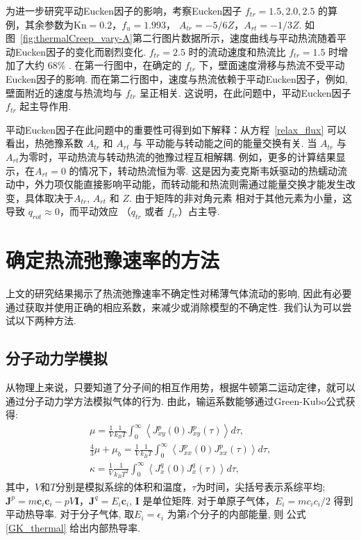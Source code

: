 为进一步研究平动Eucken因子的影响，考察Eucken因子 ${f_{tr}=1.5, 2.0, 2.5}$ 的算例，其余参数为$\text{Kn}=0.2$，$f_u=1.993$， $A_{tr}={-5/6Z}$，$A_{rt}={-1/3Z}$. 如图~\ref{fig:thermalCreep_vary-A}第二行图片数据所示，速度曲线与平动热流随着平动Eucken因子的变化而剧烈变化. ${f_{tr}=2.5}$ 时的流动速度和热流比 ${f_{tr}=1.5}$ 时增加了大约 ${68\%}$ . 在第一行图中，在确定的 $ f_{tr} $ 下，壁面速度滑移与热流不受平动Eucken因子的影响. 而在第二行图中，速度与热流依赖于平动Eucken因子，例如, 壁面附近的速度与热流均与 ${f_{tr}}$ 呈正相关. 这说明，在此问题中，平动Eucken因子 ${f_{tr}}$ 起主导作用.


平动Eucken因子在此问题中的重要性可得到如下解释：从方程~\eqref{relax_flux} 可以看出，热弛豫系数 ${A_{tr}}$ 和 ${A_{rt}}$ 与 平动能与转动能之间的能量交换有关. 当 ${A_{tr}}$ 与${A_{rt}}$为零时，平动热流与转动热流的弛豫过程互相解耦. 例如，更多的计算结果显示，在${A_{rt}=0}$ 的情况下，转动热流恒为零. 这是因为麦克斯韦妖驱动的热蠕动流动中，外力项仅能直接影响平动能，而转动能和热流则需通过能量交换才能发生改变，具体取决于${A_{tr}}$, ${A_{rt}}$ 和 $Z$. 由于矩阵的非对角元素 相对于其他元素为小量，这导致 $q_{rot}\approx0$，而平动效应 （$q_{tr}$ 或者 $f_{tr}$）占主导.



\section{确定热流弛豫速率的方法}\label{determine_uncertainity}

上文的研究结果揭示了热流弛豫速率不确定性对稀薄气体流动的影响, 因此有必要通过获取并使用正确的相应系数，来减少或消除模型的不确定性. 我们认为可以尝试以下两种方法.

\subsection{分子动力学模拟}

从物理上来说，只要知道了分子间的相互作用势，根据牛顿第二运动定律，就可以通过分子动力学方法模拟气体的行为. 由此，输运系数能够通过Green-Kubo公式获得\cite{Green1954,Kubo1957Japan}:
\begin{eqnarray}
\mu=\frac{1}{V}\frac{1}{k_BT}\int_0^\infty 
\left\langle J_{xy}^p(0)J_{xy}^p(\tau)  \right\rangle d\tau, \\
\frac{4}{3}\mu+\mu_b=\frac{1}{V}\frac{1}{k_BT}\int_0^\infty 
\left\langle J_{xx}^p(0)J_{xx}^p(\tau)  \right\rangle d\tau,\\
\kappa=\frac{1}{V}\frac{1}{k_BT^2}\int_0^\infty 
\left\langle J_{x}^q(0)J_{x}^q(\tau)  \right\rangle d\tau, \label{GK_thermal}
\end{eqnarray}
其中，$V$和$T$分别是模拟系综的体积和温度，$\tau$为时间，尖括号表示系综平均; 
$\bm{J}^p= m\bm{c}_i\bm{c}_i-pV\bm{I}$，$\bm{J}^q={E_i}\bm{c}_i$,  $\bm{I}$ 是单位矩阵. 对于单原子气体，$E_i=mc_ic_i/2$ 得到平动热导率. 对于分子气体, 取$E_i=\epsilon_i$ 为第$i$个分子的内部能量, 则 公式\eqref{GK_thermal} 给出内部热导率.

